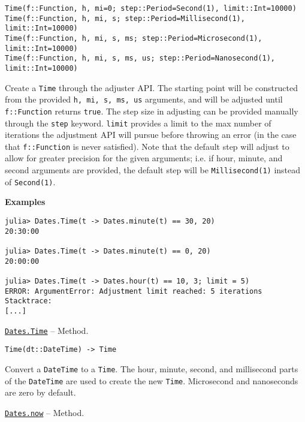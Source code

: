\begin{adjustwidth}{2em}{0pt}


\begin{verbatim}
Time(f::Function, h, mi=0; step::Period=Second(1), limit::Int=10000)
Time(f::Function, h, mi, s; step::Period=Millisecond(1), limit::Int=10000)
Time(f::Function, h, mi, s, ms; step::Period=Microsecond(1), limit::Int=10000)
Time(f::Function, h, mi, s, ms, us; step::Period=Nanosecond(1), limit::Int=10000)
\end{verbatim}

Create a \texttt{Time} through the adjuster API. The starting point will be constructed from the provided \texttt{h, mi, s, ms, us} arguments, and will be adjusted until \texttt{f::Function} returns \texttt{true}. The step size in adjusting can be provided manually through the \texttt{step} keyword. \texttt{limit} provides a limit to the max number of iterations the adjustment API will pursue before throwing an error (in the case that \texttt{f::Function} is never satisfied). Note that the default step will adjust to allow for greater precision for the given arguments; i.e. if hour, minute, and second arguments are provided, the default step will be \texttt{Millisecond(1)} instead of \texttt{Second(1)}.

\textbf{Examples}


\begin{verbatim}
julia> Dates.Time(t -> Dates.minute(t) == 30, 20)
20:30:00

julia> Dates.Time(t -> Dates.minute(t) == 0, 20)
20:00:00

julia> Dates.Time(t -> Dates.hour(t) == 10, 3; limit = 5)
ERROR: ArgumentError: Adjustment limit reached: 5 iterations
Stacktrace:
[...]
\end{verbatim}



\end{adjustwidth}
\hypertarget{12276226804029079320}{} 
\hyperlink{12276226804029079320}{\texttt{Dates.Time}}  -- {Method.}

\begin{adjustwidth}{2em}{0pt}


\begin{verbatim}
Time(dt::DateTime) -> Time
\end{verbatim}

Convert a \texttt{DateTime} to a \texttt{Time}. The hour, minute, second, and millisecond parts of the \texttt{DateTime} are used to create the new \texttt{Time}. Microsecond and nanoseconds are zero by default.



\end{adjustwidth}
\hypertarget{18169882256128304087}{} 
\hyperlink{18169882256128304087}{\texttt{Dates.now}}  -- {Method.}

